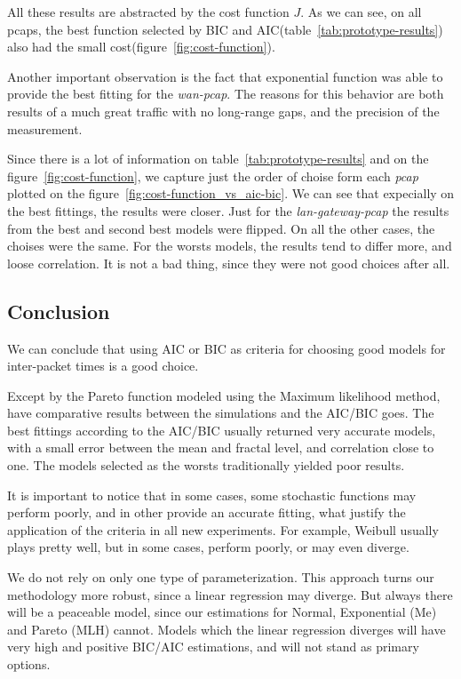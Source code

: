 All these results are abstracted by the cost function $J$. As we can see, on all pcaps, the best function selected by BIC and AIC(table~\ref{tab:prototype-results}) also had the small cost(figure~\ref{fig:cost-function}). 

Another important observation is the fact that exponential function was able to provide the best fitting for the \textit{wan-pcap}. The reasons for this behavior are both results of a much great traffic with no long-range gaps, and the precision of the measurement.


Since there is a lot of information on table~\ref{tab:prototype-results} and on the figure~\ref{fig:cost-function}, we capture just the order of choise form each \textit{pcap} plotted on the figure~\ref{fig:cost-function_vs_aic-bic}. We can see that expecially on the best fittings, the results were closer. Just for the \textit{lan-gateway-pcap} the results from the best and second best models were flipped. On all the other cases, the choises were the same. For the worsts models, the results tend to differ more, and loose correlation. It is not a bad thing, since they were not good choices after all. 



\subsection{Conclusion}


We can conclude that using AIC or BIC as criteria for choosing good models for inter-packet times is a good choice.

Except by the Pareto function modeled using the Maximum likelihood method, have comparative results between the simulations and the AIC/BIC goes. The best fittings according to the AIC/BIC usually returned very accurate models, with a small error between the mean and fractal level, and correlation close to one. The models selected as the worsts traditionally yielded poor results.

It is important to notice that in some cases, some stochastic functions may perform poorly, and in other provide an accurate fitting, what justify the application of the criteria in all new experiments. For example, Weibull usually plays pretty well, but in some cases, perform poorly, or may even diverge. 

We do not rely on only one type of parameterization. This approach turns our methodology more robust, since a linear regression may diverge. But always there will be a peaceable model, since our estimations for Normal, Exponential (Me) and Pareto (MLH) cannot. Models which the linear regression diverges will have very high and positive BIC/AIC estimations, and will not stand as primary options.


